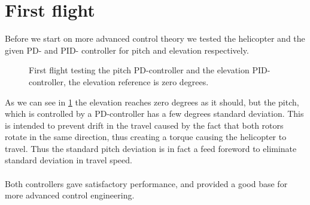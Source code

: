 
\section{First flight}\label{first_flight}
Before we start on more advanced control theory we tested the helicopter and the given PD- and PID- controller for pitch and elevation respectively.
\begin{figure}[H] 
        \centering
        \setlength{\figureheight}{6cm}
        \setlength{\figurewidth}{10cm}
        
        \caption{First flight testing the pitch PD-controller and the elevation PID-controller, the elevation reference is zero degrees.} 
\label{fig:repetition} 
\end{figure}

As we can see in \cref{fig:repetition} the elevation reaches zero degrees as it should, but the pitch, which is controlled by a PD-controller has a few degrees standard deviation. This is intended to prevent drift in the travel caused by the fact that both rotors rotate in the same direction, thus creating a torque causing the helicopter to travel. Thus the standard pitch deviation is in fact a feed foreword to eliminate standard deviation in travel speed.\\
\\
Both controllers gave satisfactory performance, and provided a good base for more advanced control engineering.